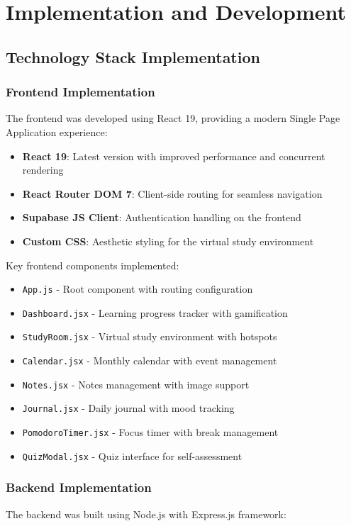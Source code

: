 \chapter{Implementation and Development}

\section{Technology Stack Implementation}

\subsection{Frontend Implementation}
The frontend was developed using React 19, providing a modern Single Page Application experience:

\begin{itemize}
    \item \textbf{React 19}: Latest version with improved performance and concurrent rendering
    \item \textbf{React Router DOM 7}: Client-side routing for seamless navigation
    \item \textbf{Supabase JS Client}: Authentication handling on the frontend
    \item \textbf{Custom CSS}: Aesthetic styling for the virtual study environment
\end{itemize}

Key frontend components implemented:
\begin{itemize}
    \item \texttt{App.js} - Root component with routing configuration
    \item \texttt{Dashboard.jsx} - Learning progress tracker with gamification
    \item \texttt{StudyRoom.jsx} - Virtual study environment with hotspots
    \item \texttt{Calendar.jsx} - Monthly calendar with event management
    \item \texttt{Notes.jsx} - Notes management with image support
    \item \texttt{Journal.jsx} - Daily journal with mood tracking
    \item \texttt{PomodoroTimer.jsx} - Focus timer with break management
    \item \texttt{QuizModal.jsx} - Quiz interface for self-assessment
\end{itemize}

\subsection{Backend Implementation}
The backend was built using Node.js with Express.js framework:

